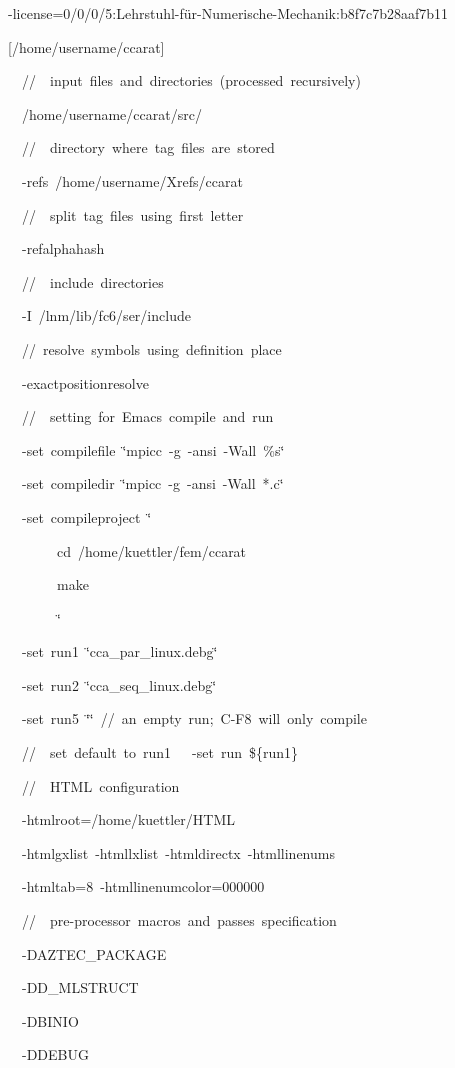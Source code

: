 \begin{lyxcode}
-license=0/0/0/5:Lehrstuhl-f\"ur-Numerische-Mechanik:b8f7c7b28aaf7b11



{[}/home/username/ccarat]

~~//~~input~files~and~directories~(processed~recursively)

~~/home/username/ccarat/src/

~~//~~directory~where~tag~files~are~stored

~~-refs~/home/username/Xrefs/ccarat

~~//~~split~tag~files~using~first~letter

~~-refalphahash

~~//~~include~directories

~~-I~/lnm/lib/fc6/ser/include

~~//~resolve~symbols~using~definition~place

~~-exactpositionresolve

~~//~~setting~for~Emacs~compile~and~run

~~-set~compilefile~\char`\"{}mpicc~-g~-ansi~-Wall~\%s\char`\"{}

~~-set~compiledir~\char`\"{}mpicc~-g~-ansi~-Wall~{*}.c\char`\"{}

~~-set~compileproject~\char`\"{}

~~~~~~~cd~/home/kuettler/fem/ccarat

~~~~~~~make

~~~~~~~\char`\"{}

~~-set~run1~\char`\"{}cca\_par\_linux.debg\char`\"{}

~~-set~run2~\char`\"{}cca\_seq\_linux.debg\char`\"{}

~~-set~run5~\char`\"{}\char`\"{}~//~an~empty~run;~C-F8~will~only~compile

~~//~~set~default~to~run1~~~-set~run~\$\{run1\}

~~//~~HTML~configuration

~~-htmlroot=/home/kuettler/HTML

~~-htmlgxlist~-htmllxlist~-htmldirectx~-htmllinenums

~~-htmltab=8~-htmllinenumcolor=000000

~~//~~pre-processor~macros~and~passes~specification

~~-DAZTEC\_PACKAGE

~~-DD\_MLSTRUCT

~~-DBINIO

~~-DDEBUG


\end{lyxcode}
